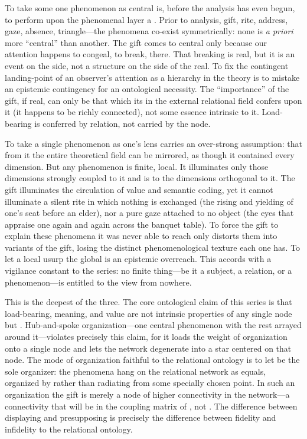  To take some one phenomenon as central is, before the analysis has even begun, to perform upon the phenomenal layer a . Prior to analysis, gift, rite, address, gaze, absence, triangle---the phenomena co-exist symmetrically: none is \emph{a priori} more ``central'' than another. The gift comes to  central only because our attention happens to congeal, to break, there. That breaking is real, but it is an event on the  side, not a structure on the side of the real. To fix the contingent landing-point of an observer's attention as a hierarchy in the theory is to mistake an epistemic contingency for an ontological necessity. The ``importance'' of the gift, if real, can only be that which its  in the external relational field confers upon it (it happens to be richly connected), not some essence intrinsic to it. Load-bearing is conferred by relation, not carried by the node.

 To take a single phenomenon as one's lens carries an over-strong assumption: that from it the entire theoretical field can be mirrored, as though it contained every dimension. But any phenomenon is finite, local. It illuminates only those dimensions strongly coupled to it and is  to the dimensions orthogonal to it. The gift illuminates the circulation of value and semantic coding, yet it cannot illuminate a silent rite in which nothing is exchanged (the rising and yielding of one's seat before an elder), nor a pure gaze attached to no object (the eyes that appraise one again and again across the banquet table). To force the gift to explain these phenomena it was never able to reach only distorts them into variants of the gift, losing the distinct phenomenological texture each one has. To let a local usurp the global is an epistemic overreach. This accords with a vigilance constant to the series: no finite thing---be it a subject, a relation, or a phenomenon---is entitled to the view from nowhere.

 This is the deepest of the three. The core ontological claim of this series is that load-bearing, meaning, and value are not intrinsic properties of any single node but . Hub-and-spoke organization---one central phenomenon with the rest arrayed around it---violates precisely this claim, for it loads the weight of organization onto a single node and lets the network degenerate into a star centered on that node. The mode of organization faithful to the relational ontology is to let  be the sole organizer: the phenomena hang on the relational network as equals, organized by  rather than radiating from some specially chosen point. In such an organization the gift is merely a node of higher connectivity in the network---a connectivity that will be  in the coupling matrix of , not . The difference between displaying and presupposing is precisely the difference between fidelity and infidelity to the relational ontology.

